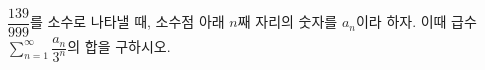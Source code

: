$\dfrac{139}{999}$를 소수로 나타낼 때, 소수점 아래 $n$째 자리의 숫자를 $a_n$이라 하자. 이때 급수 $\displaystyle\sum_{n=1}^{\infty} \dfrac{a_n}{3^n}$의 합을 구하시오.
